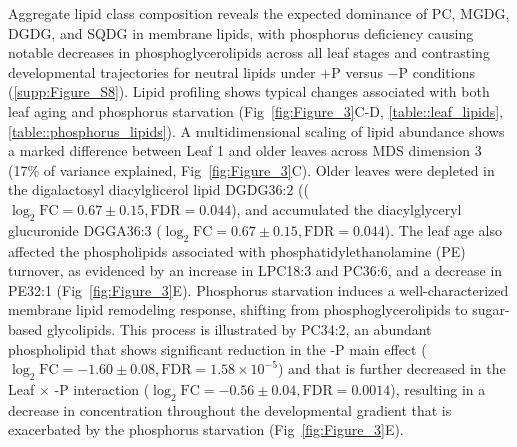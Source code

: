 \documentclass[9pt,twocolumn,twoside]{rilabRxiv}
\begin{document}
Aggregate lipid class composition reveals the expected dominance of PC, MGDG, DGDG, and SQDG in membrane lipids, with phosphorus deficiency causing notable decreases in phosphoglycerolipids across all leaf stages and contrasting developmental trajectories for neutral lipids under $+$P versus $-$P conditions (\ref{supp:Figure_S8}).
Lipid profiling shows typical changes associated with both leaf aging and phosphorus starvation (Fig~\ref{fig:Figure_3}C-D, \ref{table::leaf_lipids}, \ref{table::phosphorus_lipids}).
A multidimensional scaling of lipid abundance shows a marked difference between Leaf 1 and older leaves across MDS dimension 3 (17\% of variance explained, Fig~\ref{fig:Figure_3}C).
Older leaves were depleted in the digalactosyl diacylglicerol lipid $\text{DGDG36:2}$ (($\log_2\text{FC}=0.67 \pm 0.15, \text{FDR}=0.044$), and  accumulated  the diacylglyceryl glucuronide DGGA36:3 ($\log_2\text{FC}=0.67 \pm 0.15, \text{FDR}=0.044$).
The leaf age also affected the phospholipids associated with phosphatidylethanolamine (PE) turnover, as evidenced by an increase in LPC18:3 and PC36:6, and a decrease in PE32:1 (Fig~\ref{fig:Figure_3}E).
Phosphorus starvation induces a well-characterized membrane lipid remodeling response, shifting from phosphoglycerolipids to sugar-based glycolipids.
This process is illustrated by PC34:2, an abundant phospholipid that shows significant reduction in the -P main effect ($\log_2\text{FC}=-1.60 \pm 0.08, \text{FDR}=1.58 \times 10^{-5}$) and that is further decreased in the Leaf $\times$ -P interaction ($\log_2\text{FC}=-0.56 \pm 0.04, \text{FDR}=0.0014$), resulting in a decrease in concentration throughout the developmental gradient that is exacerbated by the phosphorus starvation (Fig~\ref{fig:Figure_3}E).
\end{document}
